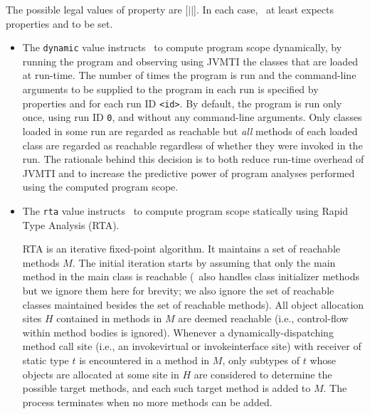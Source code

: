 The possible legal values of property  are
[$|$$|$].  In each case, \Chord\ at
least expects properties  and
 to be set.

\begin{itemize}
\item
The {\tt dynamic} value instructs \Chord\ to compute program scope
dynamically, by running the program and observing using JVMTI the
classes that are loaded at run-time.  The number of times the program
is run and the command-line arguments to be supplied to the program in
each run is specified by properties  and
 for each run ID {\tt <id>}.  By default, the
program is run only once, using run ID {\tt 0}, and without any
command-line arguments.  Only classes loaded in some run are regarded
as reachable but {\it all} methods of each loaded class are regarded
as reachable regardless of whether they were invoked in the run.  The
rationale behind this decision is to both reduce run-time overhead of
JVMTI and to increase the predictive power of program analyses
performed using the computed program scope.

\item
The {\tt rta} value instructs \Chord\ to compute program scope
statically using Rapid Type Analysis (RTA).

RTA is an iterative fixed-point algorithm.  It maintains a set of
reachable methods $M$.  The initial iteration starts by assuming that
only the main method in the main class is reachable (\Chord\ also
handles class initializer methods but we ignore them here for brevity;
we also ignore the set of reachable classes maintained besides the set
of reachable methods).  All object allocation sites $H$ contained in
methods in $M$ are deemed reachable (i.e., control-flow within method
bodies is ignored).  Whenever a dynamically-dispatching method call
site (i.e., an invokevirtual or invokeinterface site) with receiver of
static type $t$ is encountered in a method in $M$, only subtypes of
$t$ whose objects are allocated at some site in $H$ are considered to
determine the possible target methods, and each such target method is
added to $M$.  The process terminates when no more methods can be
added.


\end{itemize}
